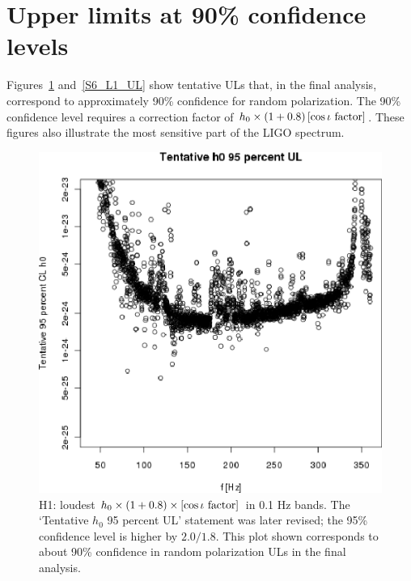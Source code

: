\section{Upper limits at 90\% confidence levels}

Figures~\ref{S6_H1_UL} and~\ref{S6_L1_UL} show tentative ULs that, in the final analysis, correspond to approximately 90\% confidence for random polarization.
The 90\% confidence level requires a correction factor of $h_0 \times \left(1+0.8 \right) \left[\cos \iota \textup{ factor} \right]$.
These figures also illustrate the most sensitive part of the LIGO spectrum.

\begin{figure}
\begin{center}
\includegraphics[width=0.68\paperwidth,height=0.48\paperheight]{plots/h0FullUL95logGuess-H1.eps}
\caption{
H1: loudest $h_0 \times \left( 1 + 0.8 \right) \times \left[\cos \iota \textup{ factor}\right]$ in 0.1 Hz bands. 
The `Tentative $h_0$ 95 percent UL' statement was later revised; the 95\% confidence level is higher by $2.0/1.8$.
This plot shown corresponds to about 90\% confidence in random polarization ULs in the final analysis.}
\label{S6_H1_UL}
\end{center}
\end{figure}

